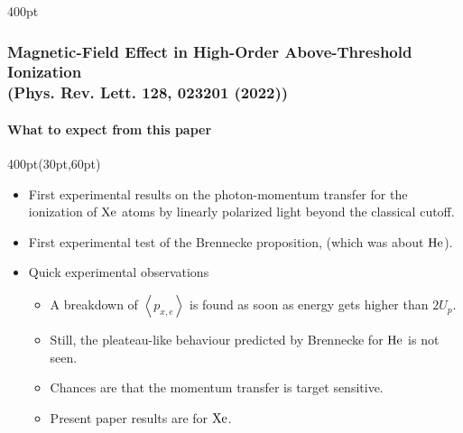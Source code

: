 \begin{frame}
\begin{textblock*}{400pt}
\begin{itemize}
\end{itemize}
\end{textblock*}

%

\end{frame}


\begin{frame}
\frametitle{Magnetic-Field Effect in High-Order Above-Threshold Ionization \\
\small (Phys. Rev. Lett. 128, 023201 (2022))}
\framesubtitle{What to expect from this paper}

\small
\begin{textblock*}{400pt}(30pt,60pt)
\begin{itemize}
\item First experimental results on the photon-momentum transfer
for the ionization of $\rm Xe$ atoms by linearly polarized light 
beyond the classical cutoff.
\item First experimental test of the Brennecke proposition, 
(which was about $\rm He$).
\vspace{10pt}
\item Quick experimental observations
\begin{itemize}
\item[$\bullet$] A breakdown of $\left\langle p_{x,e} \right\rangle$
is found as soon as energy gets higher than $2U_p$.
\item[$\bullet$] Still, the pleateau-like behaviour predicted by Brennecke 
for $\rm He$ is not seen.
\item[$\bullet$] Chances are that the momentum transfer is target sensitive.
\item[$\bullet$] Present paper results are for $\rm Xe$. 
\end{itemize}
\end{itemize}

\end{textblock*}

\end{frame}


